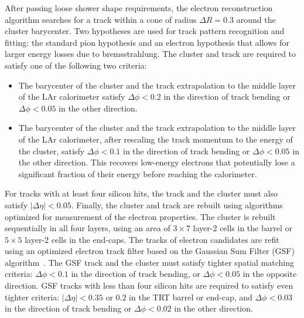 After passing loose shower shape requirements, the electron reconstruction algorithm searches for a track within a cone of radius $\Delta R=0.3$ around the cluster barycenter. Two hypotheses are used for track pattern recognition and fitting: the standard pion hypothesis and an electron hypothesis that allows for larger energy losses due to bremsstrahlung. The cluster and track are required to satisfy one of the following two criteria:

\begin{itemize}
	\item The barycenter of the cluster and the track extrapolation to the middle layer of the LAr calorimeter satisfy $\Delta\phi<0.2$ in the direction of track bending or $\Delta\phi<0.05$ in the other direction. 
	\item The barycenter of the cluster and the track extrapolation to the middle layer of the LAr calorimeter, after rescaling the track momentum to the energy of the cluster, satisfy $\Delta\phi<0.1$ in the direction of track bending or $\Delta\phi<0.05$ in the other direction. This recovers low-energy electrons that potentially lose a significant fraction of their energy before reaching the calorimeter. 
\end{itemize}
 
For tracks with at least four silicon hits, the track and the cluster must also satisfy $|\Delta\eta|<0.05$. Finally, the cluster and track are rebuilt using algorithms optimized for measurement of the electron properties. The cluster is rebuilt sequentially in all four layers, using an area of $3\times7$ layer-2 cells in the barrel or $5\times5$ layer-2 cells in the end-caps. The tracks of electron candidates are refit using an optimized electron track filter based on the Gaussian Sum Filter (GSF) algorithm~\cite{TheATLASCollaboration:2012vr}. The GSF track and the cluster must satisfy tighter spatial matching criteria: $\Delta\phi<0.1$ in the direction of track bending, or $\Delta\phi<0.05$ in the opposite direction. GSF tracks with less than four silicon hits are required to satisfy even tighter criteria: $|\Delta\eta|<0.35$ or $0.2$ in the TRT barrel or end-cap, and $\Delta\phi<0.03$ in the direction of track bending or $\Delta\phi<0.02$ in the other direction. 

